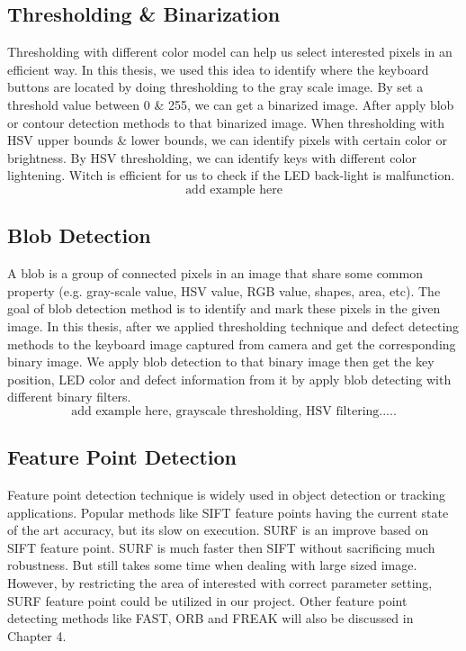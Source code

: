     \subsection{Thresholding \& Binarization}
        Thresholding with different color model can help us select interested pixels in an efficient way.
        In this thesis, we used this idea to identify where the keyboard buttons are located by doing thresholding to the gray scale image.
        By set a threshold value between 0 \& 255, we can get a binarized image.
        After apply blob or contour detection methods to that  binarized image.
        When thresholding with HSV upper bounds \& lower bounds, we can identify pixels with certain color or brightness.
        By HSV thresholding, we can identify keys with different color lightening.
        Witch is efficient for us to check if the LED back-light is malfunction.
        $$ \textrm{add example here} $$

    \subsection{Blob Detection}
        A blob is a group of connected pixels in an image that share some common property (e.g. gray-scale value, HSV value, RGB value, shapes, area, etc).
        The goal of blob detection method is to identify and mark these pixels in the given image.
        In this thesis, after we applied thresholding technique and defect detecting methods to the keyboard image captured from camera and get the corresponding binary image.
        We apply blob detection to that binary image then get the key position, LED color and defect information from it by apply blob detecting with different binary filters.
        $$ \textrm{add example here, grayscale thresholding, HSV filtering.....} $$

    \subsection{Feature Point Detection}
        Feature point detection technique is widely used in object detection or tracking applications.
        Popular methods like SIFT feature points having the current state of the art accuracy, but its slow on execution.
        SURF is an improve based on SIFT feature point. SURF is much faster then SIFT without sacrificing much robustness. But still takes some time when dealing with large sized image. 
        However, by restricting the area of interested with correct parameter setting, SURF feature point could be utilized in our project.
        Other feature point detecting methods like FAST, ORB and FREAK will also be discussed in Chapter 4.

